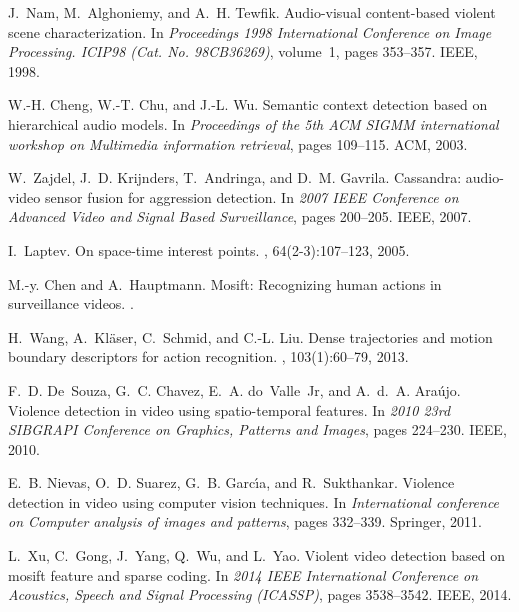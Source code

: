\documentclass[10pt,twocolumn,letterpaper]{article}
\begin{document}
{\small
\begin{thebibliography}{10}\itemsep=-1pt

J.~Nam, M.~Alghoniemy, and A.~H. Tewfik.
\newblock Audio-visual content-based violent scene characterization.
\newblock In {\em Proceedings 1998 International Conference on Image Processing. ICIP98 (Cat. No. 98CB36269)}, volume~1, pages 353--357. IEEE, 1998.

W.-H. Cheng, W.-T. Chu, and J.-L. Wu.
\newblock Semantic context detection based on hierarchical audio models.
\newblock In {\em Proceedings of the 5th ACM SIGMM international workshop on Multimedia information retrieval}, pages 109--115. ACM, 2003.

W.~Zajdel, J.~D. Krijnders, T.~Andringa, and D.~M. Gavrila.
\newblock Cassandra: audio-video sensor fusion for aggression detection.
\newblock In {\em 2007 IEEE Conference on Advanced Video and Signal Based Surveillance}, pages 200--205. IEEE, 2007.

I.~Laptev.
\newblock On space-time interest points.
, 64(2-3):107--123, 2005.

M.-y. Chen and A.~Hauptmann.
\newblock Mosift: Recognizing human actions in surveillance videos.
.

H.~Wang, A.~Kl{\"a}ser, C.~Schmid, and C.-L. Liu.
\newblock Dense trajectories and motion boundary descriptors for action recognition.
, 103(1):60--79, 2013.

F.~D. De~Souza, G.~C. Chavez, E.~A. do~Valle~Jr, and A.~d.~A. Ara{\'u}jo.
\newblock Violence detection in video using spatio-temporal features.
\newblock In {\em 2010 23rd SIBGRAPI Conference on Graphics, Patterns and Images}, pages 224--230. IEEE, 2010.

E.~B. Nievas, O.~D. Suarez, G.~B. Garc{\'\i}a, and R.~Sukthankar.
\newblock Violence detection in video using computer vision techniques.
\newblock In {\em International conference on Computer analysis of images and patterns}, pages 332--339. Springer, 2011.

L.~Xu, C.~Gong, J.~Yang, Q.~Wu, and L.~Yao.
\newblock Violent video detection based on mosift feature and sparse coding.
\newblock In {\em 2014 IEEE International Conference on Acoustics, Speech and Signal Processing (ICASSP)}, pages 3538--3542. IEEE, 2014.


\end{thebibliography}}
\end{document}
